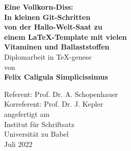 \begin{titlepage}
\begin{center}
\vspace*{0.4cm}
\textbf{\LARGE
Eine Vollkorn-Diss: \\
\vspace*{0.2cm} 
In kleinen Git-Schritten \\
von der Hallo-Welt-Saat zu \\
einem LaTeX-Template mit vielen \\
Vitaminen und Ballaststoffen \\
}
\vspace*{2.5cm}
Diplomarbeit in TeX-genese\\
\vspace*{0.3cm}
von\\
\vspace*{0.3cm}
{\large \textbf{Felix Caligula Simplicissimus}}\\
\vspace*{1.5cm}

Referent: Prof. Dr.  A. Schopenhauer\\
Korreferent: Prof. Dr. J. Kepler\\

\vspace*{4.8cm}
angefertigt am\\
Institut für Schriftsatz \\
Universität zu Babel \\
\vspace*{0.8cm}
Juli 2022
\end{center}

\end{titlepage}
